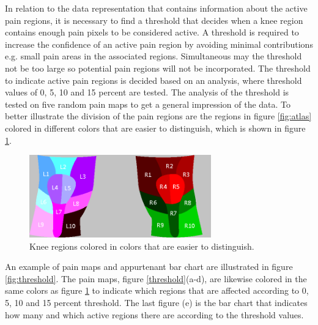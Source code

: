 \noindent 
In relation to the data representation that contains information about the active pain regions, it is necessary to find a threshold that decides when a knee region contains enough pain pixels to be considered active. A threshold is required to increase the confidence of an active pain region by avoiding minimal contributions e.g. small pain areas in the associated regions. Simultaneous may the threshold not be too large so potential pain regions will not be incorporated. The threshold to indicate active pain regions is decided based on an analysis, where threshold values of 0, 5, 10 and 15 percent are tested. The analysis of the threshold is tested on five random pain maps to get a general impression of the data. To better illustrate the division of the pain regions are the regions in figure \ref{fig:atlas} colored in different colors that are easier to distinguish, which is shown in figure \ref{fig:colorregion}.

\begin{figure} [H]
\centering
\includegraphics[width=0.7\textwidth]{figures/colorregion}
\caption{Knee regions colored in colors that are easier to distinguish.}
\label{fig:colorregion}
\end{figure}

\noindent
An example of pain maps and appurtenant bar chart are illustrated in figure \ref{fig:threshold}. The pain maps, figure \ref{threshold}(a-d), are likewise colored in the same colors as figure \ref{fig:colorregion} to indicate which regions that are affected according to 0, 5, 10 and 15 percent threshold. The last figure (e) is the bar chart that indicates how many and which active regions there are according to the threshold values.

